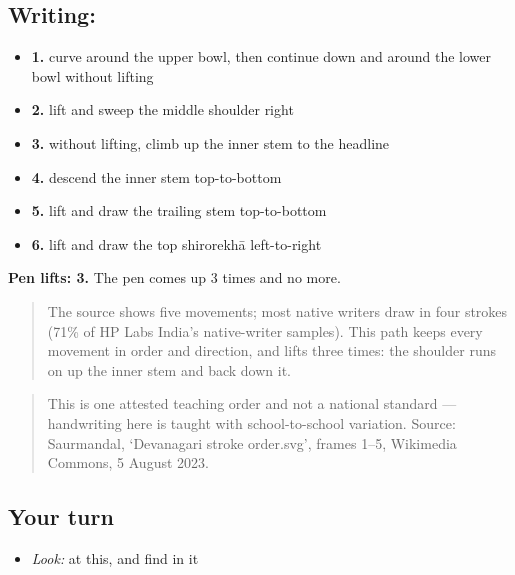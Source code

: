 \subsection*{Writing: }

\begin{itemize}
\raggedright
  \item \textbf{1.} curve around the upper bowl, then continue down and around the lower bowl without lifting
  \item \textbf{2.} lift and sweep the middle shoulder right
  \item \textbf{3.} without lifting, climb up the inner stem to the headline
  \item \textbf{4.} descend the inner stem top-to-bottom
  \item \textbf{5.} lift and draw the trailing stem top-to-bottom
  \item \textbf{6.} lift and draw the top shirorekhā left-to-right
\end{itemize}

\textbf{Pen lifts: 3.} The pen comes up 3 times and no more.

\begin{quote}
The source shows five movements; most native writers draw  in four strokes (71\% of HP Labs India's native-writer samples). This path keeps every movement in order and direction, and lifts three times: the shoulder runs on up the inner stem and back down it.
\end{quote}

\begin{quote}
This is one attested teaching order and not a national standard — handwriting here is taught with school-to-school variation. Source: Saurmandal, ‘Devanagari  stroke order.svg’, frames 1–5, Wikimedia Commons, 5 August 2023.
\end{quote}

\subsection*{Your turn}
\begin{itemize}
\raggedright
  \item \emph{Look:} at this, and find  in it
\end{itemize}

\begin{quote}
\end{quote}

